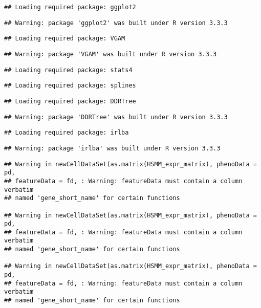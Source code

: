\documentclass[]{article}
\begin{document}
\begin{verbatim}
## Loading required package: ggplot2
\end{verbatim}

\begin{verbatim}
## Warning: package 'ggplot2' was built under R version 3.3.3
\end{verbatim}

\begin{verbatim}
## Loading required package: VGAM
\end{verbatim}

\begin{verbatim}
## Warning: package 'VGAM' was built under R version 3.3.3
\end{verbatim}

\begin{verbatim}
## Loading required package: stats4
\end{verbatim}

\begin{verbatim}
## Loading required package: splines
\end{verbatim}

\begin{verbatim}
## Loading required package: DDRTree
\end{verbatim}

\begin{verbatim}
## Warning: package 'DDRTree' was built under R version 3.3.3
\end{verbatim}

\begin{verbatim}
## Loading required package: irlba
\end{verbatim}

\begin{verbatim}
## Warning: package 'irlba' was built under R version 3.3.3
\end{verbatim}

\begin{verbatim}
## Warning in newCellDataSet(as.matrix(HSMM_expr_matrix), phenoData = pd,
## featureData = fd, : Warning: featureData must contain a column verbatim
## named 'gene_short_name' for certain functions

## Warning in newCellDataSet(as.matrix(HSMM_expr_matrix), phenoData = pd,
## featureData = fd, : Warning: featureData must contain a column verbatim
## named 'gene_short_name' for certain functions

## Warning in newCellDataSet(as.matrix(HSMM_expr_matrix), phenoData = pd,
## featureData = fd, : Warning: featureData must contain a column verbatim
## named 'gene_short_name' for certain functions
\end{verbatim}
\end{document}
